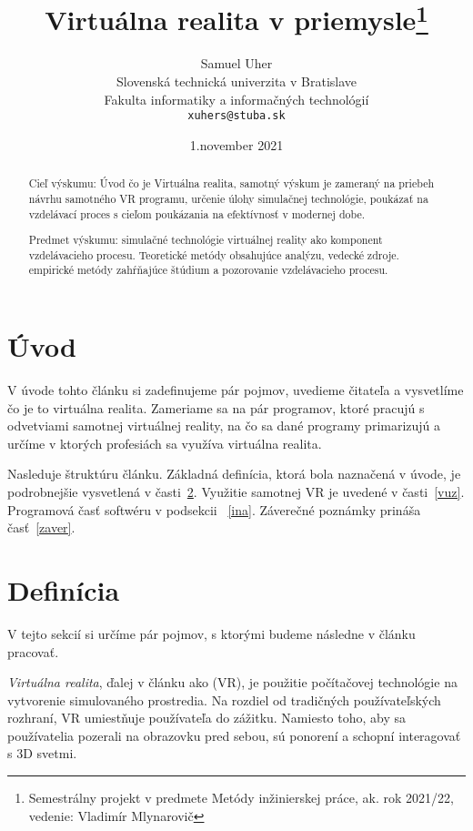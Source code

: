 \documentclass[10pt,twoside,slovak,a4paper]{article}
\title{Virtuálna realita v priemysle\thanks{Semestrálny projekt v predmete Metódy inžinierskej práce, ak. rok 2021/22, vedenie: Vladimír Mlynarovič}} %
\author{Samuel Uher\\[2pt]
	{\small Slovenská technická univerzita v Bratislave}\\
	{\small Fakulta informatiky a informačných technológií}\\
	{\small \texttt{xuhers@stuba.sk}}
	}
\date{\small 1.november 2021}
\begin{document}
\maketitle

\begin{abstract}
Cieľ výskumu: Úvod čo je Virtuálna realita, samotný výskum je zameraný na priebeh návrhu samotného VR programu, 
určenie úlohy simulačnej technológie, poukázať na vzdelávací proces s cieľom poukázania 
na efektívnosť v modernej dobe.\vspace{5mm}

Predmet výskumu: simulačné technológie virtuálnej reality ako komponent
vzdelávacieho procesu. Teoretické metódy obsahujúce analýzu, 
vedecké zdroje. empirické metódy zahŕňajúce štúdium a pozorovanie
vzdelávacieho procesu. 


\end{abstract}



\section{Úvod}
V úvode tohto článku si zadefinujeme pár pojmov, uvedieme čitateľa a vysvetlíme čo je to virtuálna realita. Zameriame sa na pár programov, 
ktoré pracujú s odvetviami samotnej virtuálnej reality, na čo sa dané programy primarizujú a určíme v ktorých profesiách sa využíva virtuálna realita.\vspace{5mm}

Nasleduje štruktúru článku. Základná definícia, ktorá bola naznačená v úvode, je podrobnejšie vysvetlená v časti~\ref{def}.
Využitie samotnej VR je uvedené v časti~\ref{vuz}. Programová časť softwéru v podsekcii ~\ref{ina}.
Záverečné poznámky prináša časť~\ref{zaver}.



\section{Definícia} \label{def}
V tejto sekcií si určíme pár pojmov, s ktorými budeme následne v článku pracovať.
\vspace{25mm}	

\emph{Virtuálna realita}, ďalej v článku ako (VR), je použitie počítačovej technológie na vytvorenie simulovaného prostredia. Na rozdiel od tradičných používateľských rozhraní, VR umiestňuje používateľa do zážitku. Namiesto toho, aby sa používatelia pozerali na obrazovku pred sebou, sú ponorení a schopní interagovať s 3D svetmi.\vspace{5mm}\cite{joebardie_2020}
\end{document}

